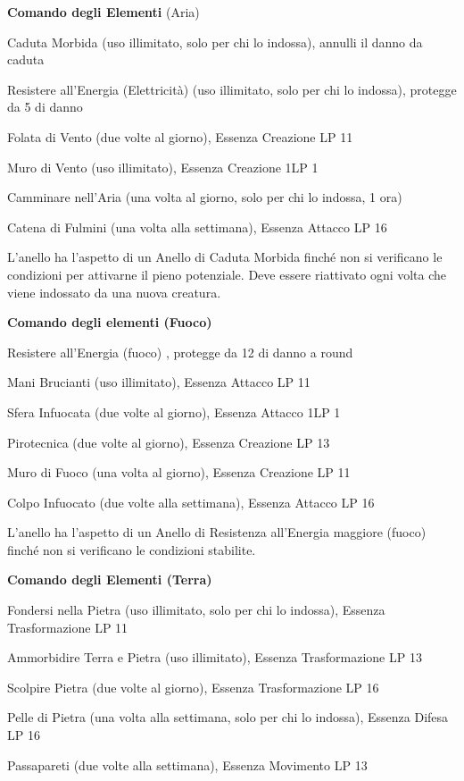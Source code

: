 \documentclass[a4paper,11pt,twoside,openany]{book}
\begin{document}
\textbf{Comando degli Elementi} (Aria)

Caduta Morbida (uso illimitato, solo per chi lo indossa), annulli il danno da caduta

Resistere all'Energia (Elettricità) (uso illimitato, solo per chi lo indossa), protegge da 5 di danno

Folata di Vento (due volte al giorno), Essenza Creazione LP 11

Muro di Vento (uso illimitato), Essenza Creazione 1LP 1

Camminare nell'Aria (una volta al giorno, solo per chi lo indossa, 1 ora)

Catena di Fulmini (una volta alla settimana), Essenza Attacco LP 16

L'anello ha l'aspetto di un Anello di Caduta Morbida finché non si verificano le condizioni per attivarne il pieno potenziale. Deve essere riattivato ogni volta che viene indossato da una nuova creatura.

\textbf{Comando degli elementi (Fuoco)}

Resistere all'Energia (fuoco) , protegge da 12 di danno a round

Mani Brucianti (uso illimitato), Essenza Attacco LP 11

Sfera Infuocata (due volte al giorno), Essenza Attacco 1LP 1

Pirotecnica (due volte al giorno), Essenza Creazione LP 13

Muro di Fuoco (una volta al giorno), Essenza Creazione LP 11

Colpo Infuocato (due volte alla settimana), Essenza Attacco LP 16

L'anello ha l'aspetto di un Anello di Resistenza all'Energia maggiore (fuoco) finché non si verificano le condizioni stabilite.

\textbf{Comando degli Elementi (Terra)}

Fondersi nella Pietra (uso illimitato, solo per chi lo indossa), Essenza Trasformazione LP 11

Ammorbidire Terra e Pietra (uso illimitato), Essenza Trasformazione LP 13

Scolpire Pietra (due volte al giorno), Essenza Trasformazione LP 16

Pelle di Pietra (una volta alla settimana, solo per chi lo indossa), Essenza Difesa LP 16

Passapareti (due volte alla settimana), Essenza Movimento LP 13
\end{document}
